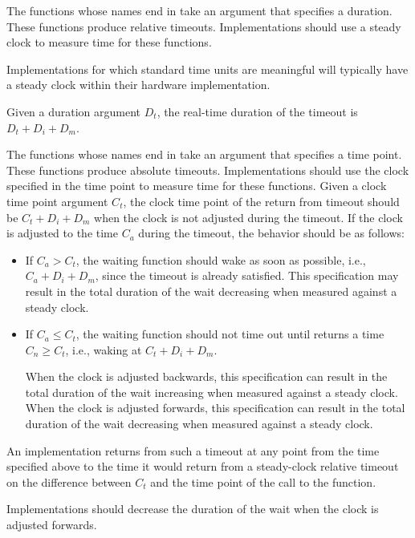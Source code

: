 \pnum
The functions whose names end in  take an argument that
specifies a duration. These functions produce relative timeouts. Implementations
should use a steady clock to measure time for these functions.
\begin{footnote}
Implementations for which standard time units are meaningful will typically
have a steady clock within their hardware implementation.
\end{footnote}
Given a duration
argument $D_t$, the real-time duration of the timeout is $D_t + D_i + D_m$.

\pnum
The functions whose names end in  take an argument that specifies a time
point. These functions produce absolute timeouts. Implementations should use the clock
specified in the time point to measure time for these functions. Given a clock time point
argument $C_t$, the clock time point of the return from timeout should be $C_t + D_i + D_m$
when the clock is not adjusted during the timeout. If the clock is adjusted to the time $C_a$
during the timeout, the behavior should be as follows:
\begin{itemize}
\item
If $C_a > C_t$, the waiting function should wake as soon as possible, i.e., $C_a + D_i + D_m$,
since the timeout is already satisfied.
This specification may result in the total
duration of the wait decreasing when measured against a steady clock.

\item
If $C_a \leq C_t$, the waiting function should not time out until  returns a
time $C_n \geq C_t$, i.e., waking at $C_t + D_i + D_m$.
\begin{note}
When the clock is adjusted
backwards, this specification can result in the total duration of the wait increasing when
measured against a steady clock. When the clock is adjusted forwards, this specification can
result in the total duration of the wait decreasing when measured against a steady clock.
\end{note}
\end{itemize}

An implementation returns from such a timeout at any point from the time specified above to
the time it would return from a steady-clock relative timeout on the difference between $C_t$
and the time point of the call to the  function.

\recommended
Implementations
should decrease the duration of the wait when the clock is adjusted forwards.

